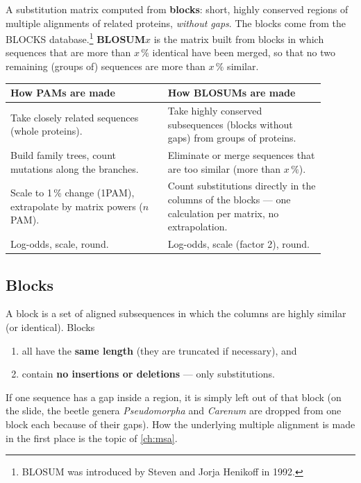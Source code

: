 \documentclass[11pt, oneside]{book}
\let\originalsubsection\subsection
\renewcommand{\subsection}{\Needspace{6\baselineskip}\originalsubsection}
\begin{document}
\begin{defbox}[title={BLOSUM = BLOcks SUbstitution Matrix}]
A substitution matrix computed from \textbf{blocks}: short, highly conserved
regions of multiple alignments of related proteins, \emph{without gaps}. The
blocks come from the BLOCKS database.\footnote{BLOSUM was introduced by
Steven and Jorja Henikoff in 1992.} \textbf{BLOSUM$x$} is the matrix built
from blocks in which sequences that are more than $x\,\%$ identical have been
merged, so that no two remaining (groups of) sequences are more than
$x\,\%$ similar.
\end{defbox}

\begin{center}
\small
\begin{tabular}{@{}p{0.45\linewidth}p{0.45\linewidth}@{}}
\toprule
\textbf{How PAMs are made} & \textbf{How BLOSUMs are made} \\
\midrule
Take closely related sequences (whole proteins). &
Take highly conserved subsequences (blocks without gaps) from groups of
proteins. \\
Build family trees, count mutations along the branches. &
Eliminate or merge sequences that are too similar (more than $x\,\%$). \\
Scale to 1\,\% change (1PAM), extrapolate by matrix powers ($n$PAM). &
Count substitutions directly in the columns of the blocks --- one
calculation per matrix, no extrapolation. \\
Log-odds, scale, round. & Log-odds, scale (factor 2), round. \\
\bottomrule
\end{tabular}
\end{center}

\subsection{Blocks}

A block is a set of aligned subsequences in which the columns are highly
similar (or identical). Blocks
\begin{enumerate}
  \item all have the \textbf{same length} (they are truncated if necessary), and
  \item contain \textbf{no insertions or deletions} --- only substitutions.
\end{enumerate}
If one sequence has a gap inside a region, it is simply left out of that block
(on the slide, the beetle genera \emph{Pseudomorpha} and \emph{Carenum} are
dropped from one block each because of their gaps). How the underlying multiple
alignment is made in the first place is the topic of \cref{ch:msa}.
\end{document}
